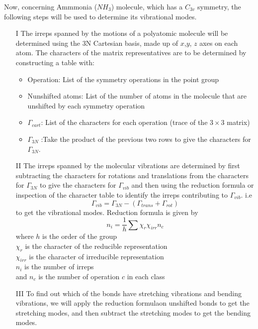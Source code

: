 \documentclass[a4paper, 12pt, openany]{report}
\begin{document}
 Now, concerning Ammmonia ($NH_3$) molecule, which has a $C_{3v}$ \break symmetry, the following steps will be used to determine its vibrational modes.\\\begin{itemize}
 	\item[I] The irreps spanned by the motions of a polyatomic molecule will be \linebreak determined using the 3N Cartesian basis, made up of $x$,$ y$, $z$ axes on each atom. The characters of the matrix representatives are to be determined by constructing a table with:
 \begin{itemize}\item Operation: List of the symmetry operations in the point group
 	\item 	Nunshifted atoms: List of the number of atoms in the molecule that are unshifted by each symmetry operation
 	\item $\Gamma_{cart}$: List of the characters for each operation (trace of the $3\times3$ matrix)
 	\item $\Gamma_{3N}$ :Take the product of the previous two rows to give the \break characters for $\Gamma_{3N}$.\end{itemize}
 \item[II] The irreps spanned by the molecular vibrations are determined by first subtracting the characters for
 	rotations and translations from the \break characters for $\Gamma_{3N}$ to give the characters for $\Gamma_{vib}$ and then using the 	reduction formula or inspection of the character table to identify the irreps contributing to $\Gamma_{vib}$.
 	i.e  $$\Gamma_{vib}=\Gamma_{3N}-(\Gamma_{trans}+\Gamma_{rot})$$
 	 to get the vibrational modes.
 	Reduction formula is given by
 	$$n_i=\frac{1}{h}\sum\chi_r\chi_{irr}n_c$$ where $h$ is the order of the group\\$\chi_r$ is the character of the reducible representation\\$\chi_{irr}$ is the character of irreducible representation\\ $n_i$ is the number of irreps\\and  $n_c$ is the number of operation $c$ in each class
 	
 \item[III] To find out which of the bonds have stretching vibrations and bending \linebreak vibrations, we will apply the reduction formulaon unshifted bonds to get the stretching modes, and then subtract the stretching modes to get the bending modes. \end{itemize}
 
\end{document}

